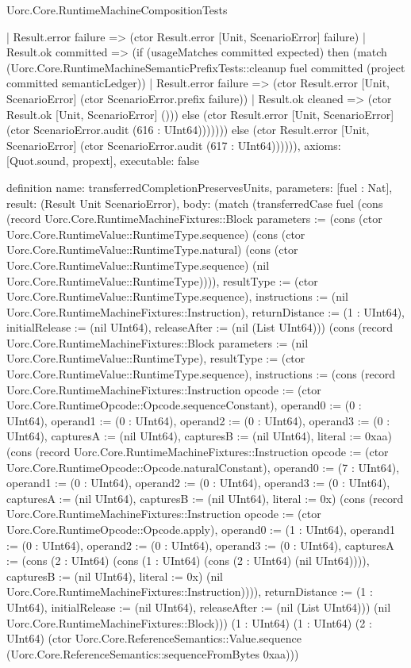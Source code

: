 \begin{lexlean}{Uorc.Core.RuntimeMachineCompositionTests}
\begin{semanticmodule}
{          | Result.error failure => (ctor Result.error [Unit, ScenarioError] failure)
          | Result.ok committed => (if (usageMatches committed expected) then (match (Uorc.Core.RuntimeMachineSemanticPrefixTests::cleanup fuel committed (project committed semanticLedger))
            | Result.error failure => (ctor Result.error [Unit, ScenarioError] (ctor ScenarioError.prefix failure))
            | Result.ok cleaned => (ctor Result.ok [Unit, ScenarioError] ())) else (ctor Result.error [Unit, ScenarioError] (ctor ScenarioError.audit (616 : UInt64))))))) else (ctor Result.error [Unit, ScenarioError] (ctor ScenarioError.audit (617 : UInt64)))))),
  axioms: [Quot.sound, propext],
  executable: false
}

definition{
  name: transferredCompletionPreservesUnits,
  parameters: [fuel : Nat],
  result: (Result Unit ScenarioError),
  body: (match (transferredCase fuel (cons (record Uorc.Core.RuntimeMachineFixtures::Block {parameters := (cons (ctor Uorc.Core.RuntimeValue::RuntimeType.sequence) (cons (ctor Uorc.Core.RuntimeValue::RuntimeType.natural) (cons (ctor Uorc.Core.RuntimeValue::RuntimeType.sequence) (nil Uorc.Core.RuntimeValue::RuntimeType)))), resultType := (ctor Uorc.Core.RuntimeValue::RuntimeType.sequence), instructions := (nil Uorc.Core.RuntimeMachineFixtures::Instruction), returnDistance := (1 : UInt64), initialRelease := (nil UInt64), releaseAfter := (nil (List UInt64))}) (cons (record Uorc.Core.RuntimeMachineFixtures::Block {parameters := (nil Uorc.Core.RuntimeValue::RuntimeType), resultType := (ctor Uorc.Core.RuntimeValue::RuntimeType.sequence), instructions := (cons (record Uorc.Core.RuntimeMachineFixtures::Instruction {opcode := (ctor Uorc.Core.RuntimeOpcode::Opcode.sequenceConstant), operand0 := (0 : UInt64), operand1 := (0 : UInt64), operand2 := (0 : UInt64), operand3 := (0 : UInt64), capturesA := (nil UInt64), capturesB := (nil UInt64), literal := 0xaa}) (cons (record Uorc.Core.RuntimeMachineFixtures::Instruction {opcode := (ctor Uorc.Core.RuntimeOpcode::Opcode.naturalConstant), operand0 := (7 : UInt64), operand1 := (0 : UInt64), operand2 := (0 : UInt64), operand3 := (0 : UInt64), capturesA := (nil UInt64), capturesB := (nil UInt64), literal := 0x}) (cons (record Uorc.Core.RuntimeMachineFixtures::Instruction {opcode := (ctor Uorc.Core.RuntimeOpcode::Opcode.apply), operand0 := (1 : UInt64), operand1 := (0 : UInt64), operand2 := (0 : UInt64), operand3 := (0 : UInt64), capturesA := (cons (2 : UInt64) (cons (1 : UInt64) (cons (2 : UInt64) (nil UInt64)))), capturesB := (nil UInt64), literal := 0x}) (nil Uorc.Core.RuntimeMachineFixtures::Instruction)))), returnDistance := (1 : UInt64), initialRelease := (nil UInt64), releaseAfter := (nil (List UInt64))}) (nil Uorc.Core.RuntimeMachineFixtures::Block))) (1 : UInt64) (1 : UInt64) (2 : UInt64) (ctor Uorc.Core.ReferenceSemantics::Value.sequence (Uorc.Core.ReferenceSemantics::sequenceFromBytes 0xaa)))
}
\end{semanticmodule}
\end{lexlean}

